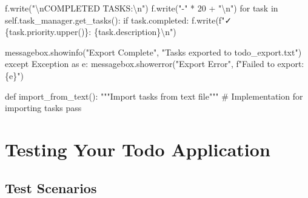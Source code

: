 \documentclass[
  letterpaper,
  DIV=11,
  numbers=noendperiod,
  oneside]{scrreprt}
\newenvironment{Shaded}{}{}
\newcommand{\CharTok}[1]{\textcolor[rgb]{0.01,0.18,0.38}{#1}}
\newcommand{\CommentTok}[1]{\textcolor[rgb]{0.42,0.45,0.49}{#1}}
\newcommand{\ControlFlowTok}[1]{\textcolor[rgb]{0.84,0.23,0.29}{#1}}
\newcommand{\DecValTok}[1]{\textcolor[rgb]{0.00,0.36,0.77}{#1}}
\newcommand{\ImportTok}[1]{\textcolor[rgb]{0.01,0.18,0.38}{#1}}
\newcommand{\KeywordTok}[1]{\textcolor[rgb]{0.84,0.23,0.29}{#1}}
\newcommand{\NormalTok}[1]{\textcolor[rgb]{0.14,0.16,0.18}{#1}}
\newcommand{\OperatorTok}[1]{\textcolor[rgb]{0.14,0.16,0.18}{#1}}
\newcommand{\PreprocessorTok}[1]{\textcolor[rgb]{0.84,0.23,0.29}{#1}}
\newcommand{\SpecialCharTok}[1]{\textcolor[rgb]{0.00,0.36,0.77}{#1}}
\newcommand{\SpecialStringTok}[1]{\textcolor[rgb]{0.01,0.18,0.38}{#1}}
\newcommand{\StringTok}[1]{\textcolor[rgb]{0.01,0.18,0.38}{#1}}
\newcommand{\VariableTok}[1]{\textcolor[rgb]{0.89,0.38,0.04}{#1}}
\begin{document}
\begin{Shaded}
\begin{Highlighting}[]
\NormalTok{                f.write(}\StringTok{"}\CharTok{\textbackslash{}n}\StringTok{COMPLETED TASKS:}\CharTok{\textbackslash{}n}\StringTok{"}\NormalTok{)}
\NormalTok{                f.write(}\StringTok{"{-}"} \OperatorTok{*} \DecValTok{20} \OperatorTok{+} \StringTok{"}\CharTok{\textbackslash{}n}\StringTok{"}\NormalTok{)}
                \ControlFlowTok{for}\NormalTok{ task }\KeywordTok{in} \VariableTok{self}\NormalTok{.task\_manager.get\_tasks():}
                    \ControlFlowTok{if}\NormalTok{ task.completed:}
\NormalTok{                        f.write(}\SpecialStringTok{f"✓ }\SpecialCharTok{\{}\NormalTok{task}\SpecialCharTok{.}\NormalTok{priority}\SpecialCharTok{.}\NormalTok{upper()}\SpecialCharTok{\}}\SpecialStringTok{: }\SpecialCharTok{\{}\NormalTok{task}\SpecialCharTok{.}\NormalTok{description}\SpecialCharTok{\}}\CharTok{\textbackslash{}n}\SpecialStringTok{"}\NormalTok{)}
                        
\NormalTok{            messagebox.showinfo(}\StringTok{"Export Complete"}\NormalTok{, }\StringTok{"Tasks exported to todo\_export.txt"}\NormalTok{)}
        \ControlFlowTok{except} \PreprocessorTok{Exception} \ImportTok{as}\NormalTok{ e:}
\NormalTok{            messagebox.showerror(}\StringTok{"Export Error"}\NormalTok{, }\SpecialStringTok{f"Failed to export: }\SpecialCharTok{\{}\NormalTok{e}\SpecialCharTok{\}}\SpecialStringTok{"}\NormalTok{)}
    
    \KeywordTok{def}\NormalTok{ import\_from\_text():}
        \CommentTok{"""Import tasks from text file"""}
        \CommentTok{\# Implementation for importing tasks}
        \ControlFlowTok{pass}
\end{Highlighting}
\end{Shaded}

\section{Testing Your Todo
Application}\label{testing-your-todo-application}

\subsection{Test Scenarios}\label{test-scenarios-1}
\end{document}

